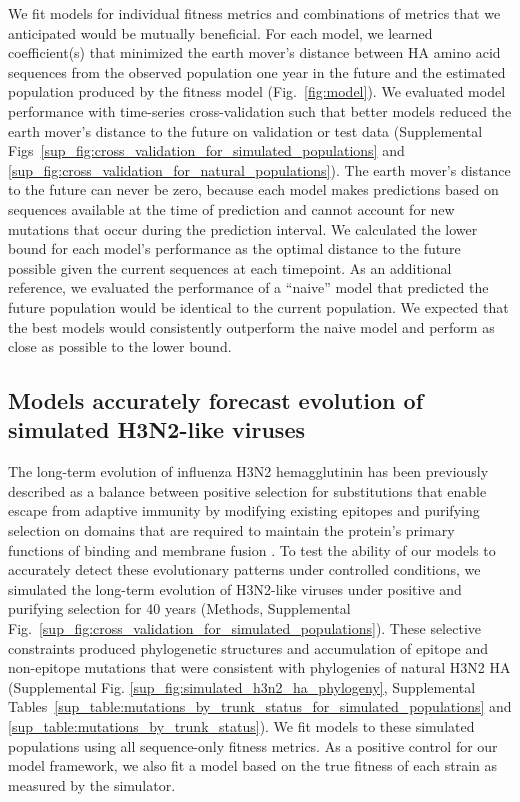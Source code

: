 We fit models for individual fitness metrics and combinations of metrics that we anticipated would be mutually beneficial.
For each model, we learned coefficient(s) that minimized the earth mover's distance between HA amino acid sequences from the observed population one year in the future and the estimated population produced by the fitness model (Fig.~\ref{fig:model}).
We evaluated model performance with time-series cross-validation such that better models reduced the earth mover's distance to the future on validation or test data (Supplemental Figs~\ref{sup_fig:cross_validation_for_simulated_populations} and \ref{sup_fig:cross_validation_for_natural_populations}).
The earth mover's distance to the future can never be zero, because each model makes predictions based on sequences available at the time of prediction and cannot account for new mutations that occur during the prediction interval.
We calculated the lower bound for each model's performance as the optimal distance to the future possible given the current sequences at each timepoint.
As an additional reference, we evaluated the performance of a ``naive'' model that predicted the future population would be identical to the current population.
We expected that the best models would consistently outperform the naive model and perform as close as possible to the lower bound.

\subsection*{Models accurately forecast evolution of simulated H3N2-like viruses}

The long-term evolution of influenza H3N2 hemagglutinin has been previously described as a balance between positive selection for substitutions that enable escape from adaptive immunity by modifying existing epitopes and purifying selection on domains that are required to maintain the protein's primary functions of binding and membrane fusion \cite{Bush:1999vj,Neher2013,Luksza:2014hj,Koelle:2015dh}.
To test the ability of our models to accurately detect these evolutionary patterns under controlled conditions, we simulated the long-term evolution of H3N2-like viruses under positive and purifying selection for 40 years (Methods, Supplemental Fig.~\ref{sup_fig:cross_validation_for_simulated_populations}).
These selective constraints produced phylogenetic structures and accumulation of epitope and non-epitope mutations that were consistent with phylogenies of natural H3N2 HA (Supplemental Fig. \ref{sup_fig:simulated_h3n2_ha_phylogeny}, Supplemental Tables~\ref{sup_table:mutations_by_trunk_status_for_simulated_populations} and \ref{sup_table:mutations_by_trunk_status}).
We fit models to these simulated populations using all sequence-only fitness metrics.
As a positive control for our model framework, we also fit a model based on the true fitness of each strain as measured by the simulator.


